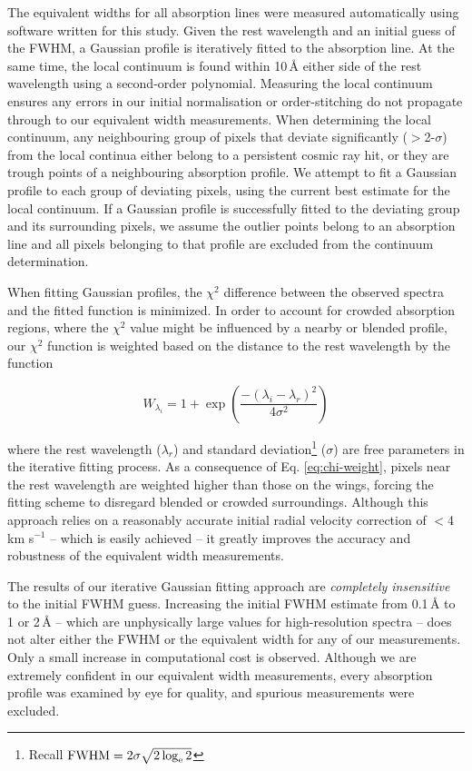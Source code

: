\documentclass{emulateapj}
\begin{document}
The equivalent widths for all absorption lines were measured automatically using software written for this study. Given the rest wavelength and an initial guess of the FWHM, a Gaussian profile is iteratively fitted to the absorption line. At the same time, the local continuum is found within 10\,\AA{} either side of the rest wavelength using a second-order polynomial. Measuring the local continuum ensures any errors in our initial normalisation or order-stitching do not propagate through to our equivalent width measurements. When determining the local continuum, any neighbouring group of pixels that deviate significantly ($>$2-$\sigma$) from the local continua either belong to a persistent cosmic ray hit, or they are trough points of a neighbouring absorption profile. We attempt to fit a Gaussian profile to each group of deviating pixels, using the current best estimate for the local continuum. If a Gaussian profile is successfully fitted to the deviating group and its surrounding pixels, we assume the outlier points belong to an absorption line and all pixels belonging to that profile are excluded from the continuum determination. 

When fitting Gaussian profiles, the $\chi^2$ difference between the observed spectra and the fitted function is minimized. In order to account for crowded absorption regions, where the $\chi^2$ value might be influenced by a nearby or blended profile, our $\chi^2$ function is weighted based on the distance to the rest wavelength by the function

\begin{equation}
W_{\lambda_{i}} = 1 + \exp{\left(\frac{-(\lambda_{i} - \lambda_{r})^2}{4\sigma^2}\right)}
\label{eq:chi-weight}
\end{equation}

\noindent where the rest wavelength ($\lambda_{r}$) and standard deviation\footnote{Recall $\rm{FWHM} = 2\sigma\sqrt{2\log_e{2}}$} ($\sigma$) are free parameters in the iterative fitting process. As a consequence of Eq. \ref{eq:chi-weight}, pixels near the rest wavelength are weighted higher than those on the wings, forcing the fitting scheme to disregard blended or crowded surroundings. Although this approach relies on a reasonably accurate initial radial velocity correction of $<$4\,km s$^{-1}$ \--- which is easily achieved \--- it greatly improves the accuracy and robustness of the equivalent width measurements.

The results of our iterative Gaussian fitting approach are \textit{completely insensitive} to the initial FWHM guess. Increasing the initial FWHM estimate from 0.1\,\AA{} to 1 or 2\,\AA{} \--- which are unphysically large values for high-resolution spectra \--- does not alter either the FWHM or the equivalent width for any of our measurements. Only a small increase in computational cost is observed. Although we are extremely confident in our equivalent width measurements, every absorption profile was examined by eye for quality, and spurious measurements were excluded.
\end{document}
